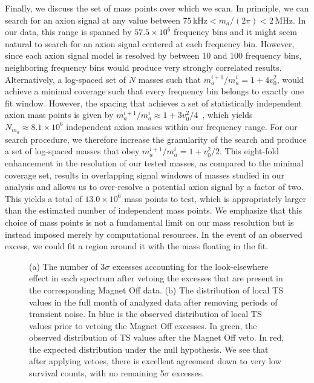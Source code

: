 \documentclass[aps,prd,amsmath,amssymb,reprint,superscriptaddress, nofootinbib,
]{revtex4-1}
\begin{document}
Finally, we discuss the set of mass points over which we scan. In principle, we can search for an axion signal at any value between $75\,\mathrm{kHz}<m_a/(2\pi)<2\,\mathrm{MHz}$. In our data, this range is spanned by $57.5\times10^6$ frequency bins and it might seem natural to search for an axion signal centered at each frequency bin. However, since each axion signal model is resolved by between 10 and 100 frequency bins, neighboring frequency bins would produce very strongly correlated results. Alternatively, a log-spaced set of $N$ masses such that $m_a^{i+1}/m_a^i = 1 + 4 v_0^2$, would achieve a minimal coverage such that every frequency bin belongs to exactly one fit window. However, the spacing that achieves a set of statistically independent axion mass points is given by \mbox{$m_a^{i+1}/m_a^i\approx1+3v_0^2/4$}~\cite{Foster2018}, which yields $N_{m_a}\approx8.1\times10^6$  independent axion masses within our frequency range. For our search procedure, we therefore increase the granularity of the search and produce a set of log-spaced masses that obey $m_a^{i+1}/m_a^i = 1 + v_0^2/2$. This eight-fold enhancement in the resolution of our tested masses, as compared to the minimal coverage set, results in overlapping signal windows of masses studied in our analysis and allows us to over-resolve a potential axion signal by a factor of two. This yields a total of $13.0\times10^6$ mass points to test, which is appropriately larger than the estimated number of independent mass points. We emphasize that this choice of mass points is not a fundamental limit on our mass resolution but is instead imposed merely by computational resources. In the event of an observed excess, we could fit a region around it with the mass floating in the fit.

\begin{figure*}
\centering
{}\hspace{10mm}
\caption{(a) The number of 3$\sigma$ excesses accounting for the look-elsewhere effect in each spectrum after vetoing the excesses that are present in the corresponding Magnet Off data. (b) The distribution of local TS values in the full month of analyzed data after removing periods of transient noise. In blue is the observed distribution of local TS values prior to vetoing the Magnet Off excesses. In green, the observed distribution of TS values after the Magnet Off veto. In red, the expected distribution under the null hypothesis. We see that after applying vetoes, there is excellent agreement down to very low survival counts, with no remaining 5$\sigma$ excesses.}
\end{figure*}
\end{document}
